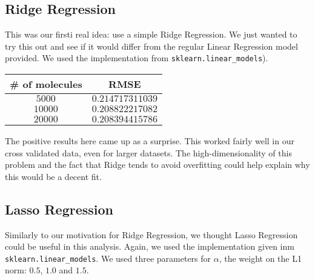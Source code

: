 \documentclass[10pt]{article}
\begin{document}
\subsection{Ridge Regression}

This was our firsti real idea: use a simple Ridge Regression. We just wanted to try
this out and see if it would differ from the regular Linear Regression model
provided. We used the implementation from \verb|sklearn.linear_models|).

\medskip

\begin{center}

\begin{tabular}[center]{|c|c|}
\hline
\# of molecules & RMSE \\
\hline
$5000$ & $0.214717311039$ \\
\hline 
$10000$ & $0.208822217082$ \\
\hline
$20000$ & $0.208394415786$ \\
\hline
\end{tabular}

\end{center}

\medskip

The positive results here came up as a surprise. This worked fairly well in our
cross validated data, even for larger datasets. The high-dimensionality of this
problem and the fact that Ridge tends to avoid overfitting could help explain
why this would be a decent fit. 

\subsection{Lasso Regression}

Similarly to our motivation for Ridge Regression, we thought Lasso Regression
could be useful in this analysis. Again, we used the implementation given
inm \verb|sklearn.linear_models|. We used three parameters for $\alpha$, the
weight on the L1 norm: $0.5$, $1.0$ and $1.5$.

\medskip
\end{document}
